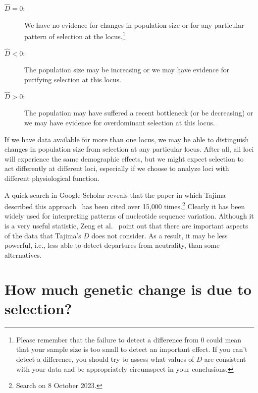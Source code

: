 \documentclass[12pt]{article}
\begin{document}
\begin{description}

\item[$\hat D = 0$:] We have no evidence for changes in population
  size or for any particular pattern of selection at the
  locus.\footnote{Please remember that the failure to detect a difference
    from 0 could mean that your sample size is too small to detect an
    important effect. If you can't detect a difference, you should try
    to assess what values of $D$ are consistent with your data and be
    appropriately circumspect in your conclusions.}

\item[$\hat D < 0$:] The population size may be increasing or we may
  have evidence for purifying selection at this locus.

\item[$\hat D > 0$:] The population may have suffered a recent
  bottleneck (or be decreasing) or we may have evidence for
  overdominant selection at this locus.

\end{description}

\noindent If we have data available for more than one locus, we may be
able to distinguish changes in population size from selection at any
particular locus. After all, all loci will experience the same
demographic effects, but we might expect selection to act differently
at different loci, especially if we choose to analyze loci with
different physiological function.

A quick search in Google Scholar reveals that the paper in which
Tajima described this approach~\cite{Tajima89} has been cited over
15,000 times.\footnote{Search on 8 October 2023.} Clearly it has been
widely used for interpreting patterns of nucleotide sequence
variation. Although it is a very useful statistic, Zeng et
al.~\cite{Zeng-etal-2006} point out that there are important aspects
of the data that Tajima's $D$ does not consider. As a result, it may
be less powerful, i.e., less able to detect departures from
neutrality, than some alternatives.

\section*{How much genetic change is due to selection?}
\end{document}
